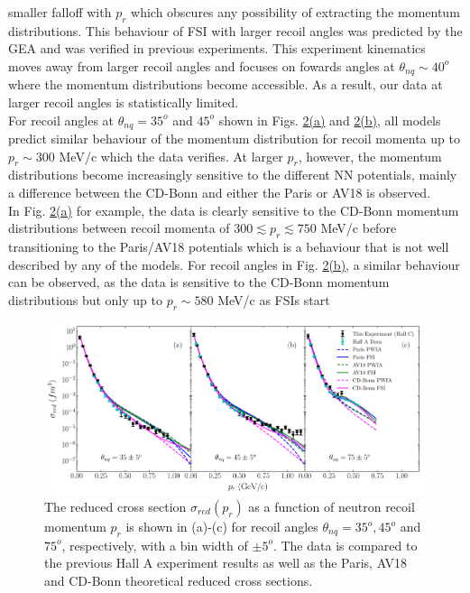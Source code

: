 smaller falloff with $p_{r}$ which obscures any possibility of extracting the momentum distributions. This behaviour of FSI with larger recoil angles was predicted by the GEA\cite{PhysRevC.56.1124,Sargsian_2001} and was verified in previous experiments\cite{PhysRevLett.107.262501,PhysRevLett.98.262502}.
This experiment kinematics moves away from larger recoil angles and focuses on fowards angles at $\theta_{nq}\sim 40^{o}$ where the momentum distributions become accessible. As a result, our data at larger recoil angles
is statistically limited. \\
\indent For recoil angles at $\theta_{nq}=35^{o}$ and $45^{o}$ shown in Figs. \hyperref[fig:fig2]{2(a)} and  \hyperref[fig:fig2]{2(b)},  all models predict similar behaviour of the
momentum distribution for recoil momenta up to $p_{r}\sim$300 MeV/c which the data verifies. At larger $p_{r}$, however, the momentum distributions become increasingly sensitive to the different
NN potentials, mainly a difference between the CD-Bonn and either the Paris or AV18 is observed. \\
\indent In Fig. \hyperref[fig:fig2]{2(a)} for example, the data is clearly sensitive to the CD-Bonn momentum distributions between recoil momenta of $300\lesssim p_{r}\lesssim750$ MeV/c before transitioning
to the Paris/AV18 potentials which is a behaviour that is not well described by any of the models. For recoil angles in Fig. \hyperref[fig:fig2]{2(b)},
a similar behaviour can be observed, as the data is sensitive to the CD-Bonn momentum distributions but only up to $p_{r}\sim 580$ MeV/c as FSIs start 
\onecolumngrid
\begin{center}
\begin{figure}[hb!]
\includegraphics[scale=0.5]{../prl_plots/PRL_plot1.pdf}
\caption{The reduced cross section $\sigma_{red}(p_{r})$ as a function of neutron recoil momentum $p_{r}$ is shown in (a)-(c) for recoil angles $\theta_{nq}=35^{o}, 45^{o}$ and $75^{o}$, respectively,
with a bin width of $\pm 5^{o}$. The data is compared to the previous Hall A experiment results as well as the Paris, AV18 and CD-Bonn theoretical reduced cross sections.}
\label{fig:fig2}
\end{figure}
\end{center} \\
